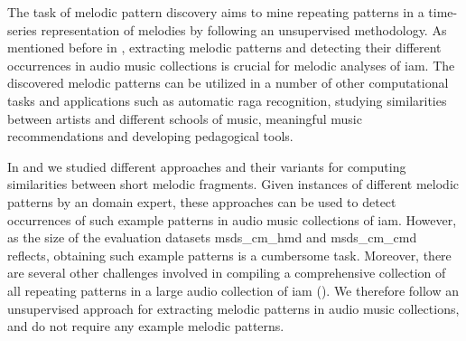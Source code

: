 
The task of melodic pattern discovery aims to mine repeating patterns in a time-series representation of melodies by following an unsupervised methodology. As mentioned before in , extracting melodic patterns and detecting their different occurrences in audio music collections is crucial for melodic analyses of \gls{iam}. The discovered melodic patterns can be utilized in a number of other computational tasks and applications such as automatic \gls{raga} recognition, studying similarities between artists and different schools of music, meaningful music recommendations and developing pedagogical tools.

In  and  we studied different approaches and their variants for computing similarities between short melodic fragments. Given instances of different melodic patterns by an domain expert, these approaches can be used to detect occurrences of such example patterns in audio music collections of \gls{iam}. However, as the size of the evaluation datasets \acrshort{msds_cm_hmd} and \acrshort{msds_cm_cmd} reflects, obtaining such example patterns is a cumbersome task. Moreover, there are several other challenges involved in compiling a comprehensive collection of all repeating patterns in a large audio collection of \gls{iam} (). We therefore follow an unsupervised approach for extracting melodic patterns in audio music collections, and do not require any example melodic patterns. 


